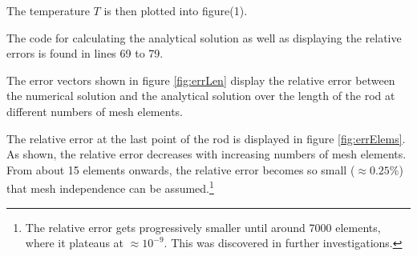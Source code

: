 The temperature $T$ is then plotted into figure(1). 

The code for calculating the analytical solution as well as displaying the relative errors is found in lines 69 to 79. 


The error vectors shown in figure \autoref{fig:errLen} display the relative error between the numerical solution and the analytical solution over the length of the rod at different numbers of mesh elements. 

The relative error at the last point of the rod is displayed in figure \autoref{fig:errElems}. As shown, the relative error decreases with increasing numbers of mesh elements. From about 15 elements onwards, the relative error becomes so small ($\approx 0.25 \%$) that mesh independence can be assumed.\footnote{The relative error gets progressively smaller until around 7000 elements, where it plateaus at $\approx 10^{-9}$. This was discovered in further investigations.}

